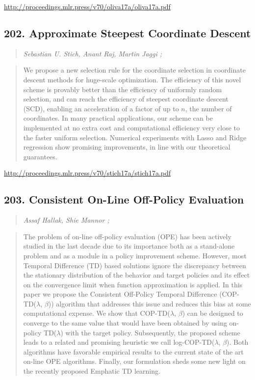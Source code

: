 \documentclass{article}
\begin{document}
\href{http://proceedings.mlr.press/v70/oliva17a/oliva17a.pdf}{http://proceedings.mlr.press/v70/oliva17a/oliva17a.pdf}

\subsection{202. Approximate Steepest Coordinate Descent}

\begin{quote}
\footnotesize{\textit{Sebastian U. Stich, Anant Raj, Martin Jaggi ;}}
\end{quote}

\begin{quote}
    We propose a new selection rule for the coordinate selection in coordinate descent methods for huge-scale optimization. The efficiency of this novel scheme is provably better than the efficiency of uniformly random selection, and can reach the efficiency of steepest coordinate descent (SCD), enabling an acceleration of a factor of up to $n$, the number of coordinates. In many practical applications, our scheme can be implemented at no extra cost and computational efficiency very close to the faster uniform selection. Numerical experiments with Lasso and Ridge regression show promising improvements, in line with our theoretical guarantees.  \end{quote}

\href{http://proceedings.mlr.press/v70/stich17a/stich17a.pdf}{http://proceedings.mlr.press/v70/stich17a/stich17a.pdf}

\subsection{203. Consistent On-Line Off-Policy Evaluation}

\begin{quote}
\footnotesize{\textit{Assaf Hallak, Shie Mannor ;}}
\end{quote}

\begin{quote}
    The problem of on-line off-policy evaluation (OPE) has been actively studied in the last decade due to its importance both as a stand-alone problem and as a module in a policy improvement scheme. However, most Temporal Difference (TD) based solutions ignore the discrepancy between the stationary distribution of the behavior and target policies and its effect on the convergence limit when function approximation is applied. In this paper we propose the Consistent Off-Policy Temporal Difference (COP-TD($\lambda$, $\beta$)) algorithm that addresses this issue and reduces this bias at some computational expense. We show that COP-TD($\lambda$, $\beta$) can be designed to converge to the same value that would have been obtained by using on-policy TD($\lambda$) with the target policy. Subsequently, the proposed scheme leads to a related and promising heuristic we call log-COP-TD($\lambda$, $\beta$). Both algorithms have favorable empirical results to the current state of the art on-line OPE algorithms. Finally, our formulation sheds some new light on the recently proposed Emphatic TD learning.  \end{quote}
\end{document}
